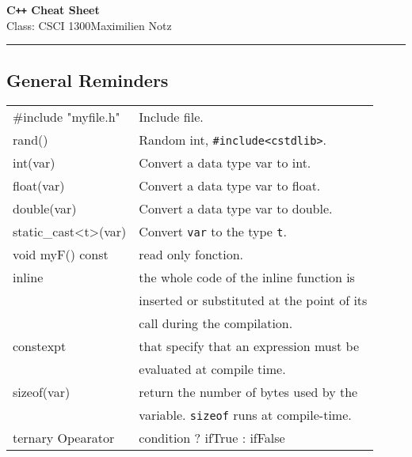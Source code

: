 \documentclass[5pt]{article}
\begin{document}
\begin{center}
     \Large{\textbf{C\texttt{++} Cheat Sheet}}\\
     \small{Class: CSCI 1300}\hfill\small{\textcopyright Maximilien Notz \the\year{}}
     \noindent\rule{20cm}{0.4pt}
\end{center}
\begin{multicols}{2}
\setcounter{secnumdepth}{0}


\subsection{General Reminders}
\begin{tabular}{>{\ttfamily}l l}

\#include "myfile.h"    & Include file.\\
rand()                  & Random int, \texttt{\#include<cstdlib>}.\\
int(var)                & Convert a data type var to int.\\
float(var)              & Convert a data type var to float.\\
double(var)             & Convert a data type var to double.\\
static\_cast<t>(var)    & Convert \texttt{var} to the type \texttt{t}.\\
void myF() const        & read only fonction.\\
inline                  & the whole code of the inline function is\\
                        & inserted or substituted at the point of its\\
                        & call during the compilation.\\
constexpt               & that specify that an expression must be\\
                        & evaluated at compile time.\\
sizeof(var)             & return the number of bytes used by the\\
                        & variable. \texttt{sizeof} runs at compile-time.\\
ternary Opearator       & condition ? ifTrue : ifFalse\\
\end{tabular}



\end{multicols}
\end{document}

